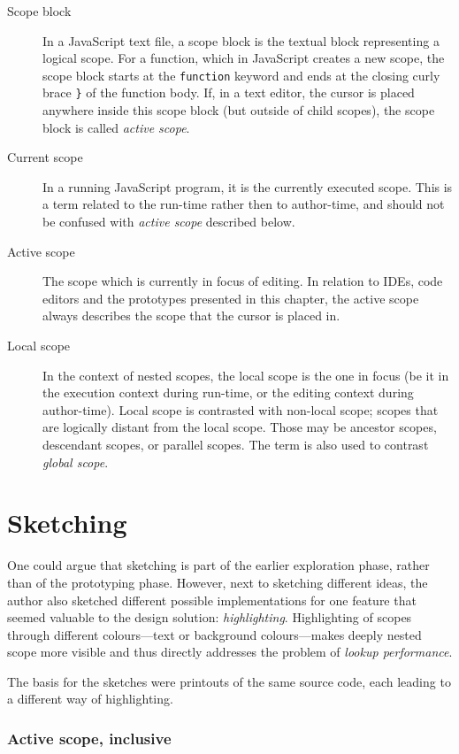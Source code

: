 \begin{description}
\item[Scope block]
In a JavaScript text file, a scope block is the textual block
representing a logical scope. For a function, which in JavaScript
creates a new scope, the scope block starts at the \texttt{function}
keyword and ends at the closing curly brace \texttt{\}} of the function
body. If, in a text editor, the cursor is placed anywhere inside this
scope block (but outside of child scopes), the scope block is called
\emph{active scope}.
\item[Current scope]
In a running JavaScript program, it is the currently executed scope.
This is a term related to the run-time rather then to author-time, and
should not be confused with \emph{active scope} described below.
\item[Active scope]
The scope which is currently in focus of editing. In relation to IDEs,
code editors and the prototypes presented in this chapter, the active
scope always describes the scope that the cursor is placed in.
\item[Local scope]
In the context of nested scopes, the local scope is the one in focus (be
it in the execution context during run-time, or the editing context
during author-time). Local scope is contrasted with non-local scope;
scopes that are logically distant from the local scope. Those may be
ancestor scopes, descendant scopes, or parallel scopes. The term is also
used to contrast \emph{global scope}.
\end{description}

\section{Sketching}\label{sketching}

One could argue that sketching is part of the earlier exploration phase,
rather than of the prototyping phase. However, next to sketching
different ideas, the author also sketched different possible
implementations for one feature that seemed valuable to the design
solution: \emph{highlighting}. Highlighting of scopes through different
colours—text or background colours—makes deeply nested scope more
visible and thus directly addresses the problem of \emph{lookup
performance}.

The basis for the sketches were printouts of the same source code, each
leading to a different way of highlighting.

\subsubsection{Active scope, inclusive}\label{active-scope-inclusive}

